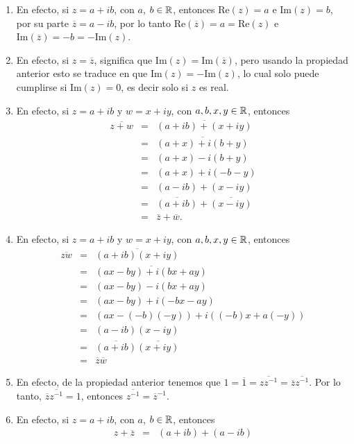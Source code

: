 \begin{enumerate}
	\item 
	En efecto, si $z=a+ib$, con $a$, $b\in\mathbb{R}$, entonces $\mbox{Re}(z)=a$ e $\mbox{Im}(z)=b$, por su parte $\overline{z}=a-ib$, por lo tanto $\mbox{Re}(\overline{z})=a=\mbox{Re}(z)$  e $\mbox{Im}(\overline{z})=-b=-\mbox{Im}(z)$.
	\item 	
	En efecto, si  $z = \overline{z}$, significa que $\mbox{Im}(z)=\mbox{Im}(\overline{z})$, pero usando la propiedad anterior esto se traduce en que $\mbox{Im}(z)=-\mbox{Im}(z)$, lo cual solo puede cumplirse si $\mbox{Im}(z)=0$, es decir solo si $z$ es real.
	\item	
	En efecto, si $z=a+ib$ y $w=x+iy$, con $a,b,x,y\in\mathbb{R}$, entonces 
	\begin{eqnarray*}
	\overline{z+w}&=&\overline{(a+ib)+(x+iy)}\\
	&=&\overline{(a+x)+i(b+y)}\\
	&=&(a+x)-i(b+y) \\
	&=&(a+x)+i(-b-y)\\
	&=&(a-ib)+(x-iy)\\
	&=&\overline{(a+ib)}+\overline{(x-iy)}\\
	&=& \overline{z} + \overline{w}.
	\end{eqnarray*}	
	\item 	
	En efecto, si $z=a+ib$ y $w=x+iy$, con $a,b,x,y\in\mathbb{R}$, entonces 
	\begin{eqnarray*}
	\overline{zw}&=&\overline{(a+ib)(x+iy)}\\
	&=&\overline{(ax-by)+i(bx+ay)}\\
	&=&(ax-by)-i(bx+ay)\\
	&=&(ax-by)+i(-bx-ay)\\
	&=&(ax-(-b)(-y))+i((-b)x+a(-y))\\
	&=&(a-ib)(x-iy)\\
	&=&\overline{(a+ib )}  \overline{(x+iy)}\\
	&=&\overline{z}  \overline{w}
	\end{eqnarray*}   
        \item
        En efecto, de la propiedad anterior tenemos que $1=\overline{1}=\overline{z z^{-1}} = \overline{z}  \overline{z^{-1}}$.
            Por lo tanto, $\overline{z}  \overline{z^{-1}} = 1 $, entonces $
            \overline{z^{-1}} = \overline{z}^{-1}$.	
	\item	
	En efecto, si $z=a+ib$, con $a$, $b\in\mathbb{R}$,  entonces
	\begin{eqnarray*}
	z + \overline{z}&=&(a+ib )+(a-ib)\\

\end{eqnarray*}
\end{enumerate}

